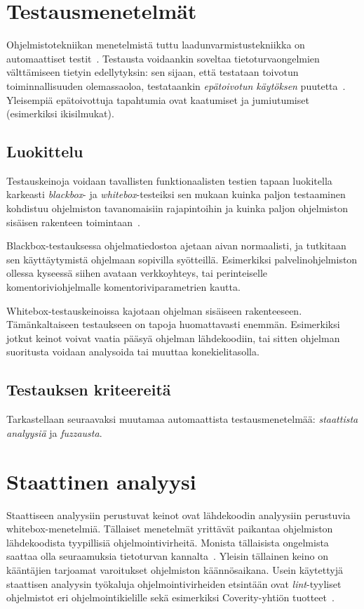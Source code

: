 \section{Testausmenetelmät}

Ohjelmistotekniikan menetelmistä tuttu laadunvarmistustekniikka on automaattiset testit~\cite{Sommerville}.
Testausta voidaankin soveltaa tietoturvaongelmien välttämiseen tietyin edellytyksin:
sen sijaan, että testataan toivotun toiminnallisuuden olemassaoloa,
testataankin \emph{epätoivotun käytöksen} puutetta~\cite{OuluBrowser}.
Yleisempiä epätoivottuja tapahtumia ovat kaatumiset ja jumiutumiset (esimerkiksi ikisilmukat).

\subsection{Luokittelu}

Testauskeinoja voidaan tavallisten funktionaalisten testien tapaan luokitella karkeasti \emph{blackbox}- ja \emph{whitebox}-testeiksi sen mukaan kuinka paljon
testaaminen kohdistuu ohjelmiston tavanomaisiin rajapintoihin ja kuinka paljon ohjelmiston sisäisen rakenteen toimintaan~\cite{Sommerville}.

Blackbox-testauksessa ohjelmatiedostoa ajetaan aivan normaalisti,
ja tutkitaan sen käyttäytymistä ohjelmaan sopivilla syötteillä.
Esimerkiksi palvelinohjelmiston ollessa kyseessä siihen avataan verkkoyhteys,
tai perinteiselle komentoriviohjelmalle komentoriviparametrien kautta.

Whitebox-testauskeinoissa kajotaan ohjelman sisäiseen rakenteeseen.
Tä\-män\-kal\-tai\-seen testaukseen on tapoja huomattavasti enemmän.
Esimerkiksi jotkut keinot voivat vaatia pääsyä ohjelman lähdekoodiin,
tai sitten ohjelman suoritusta voidaan analysoida tai muuttaa konekielitasolla.

\subsection{Testauksen kriteereitä}

Tarkastellaan seuraavaksi muutamaa automaattista testausmenetelmää: \emph{staattista analyysiä} ja \emph{fuzzausta}.

\section{Staattinen analyysi}

Staattiseen analyysiin perustuvat keinot ovat lähdekoodin analyysiin perustuvia whitebox-menetelmiä.
Tällaiset menetelmät yrittävät paikantaa ohjelmiston lähdekoodista tyypillisiä ohjelmointivirheitä.
Monista tällaisista ongelmista saattaa olla seuraamuksia tietoturvan kannalta~\cite{StaticCodeAnalysis}.
Yleisin tällainen keino on kääntäjien tarjoamat varoitukset ohjelmiston käännösaikana.
Usein käytettyjä staattisen analyysin työkaluja ohjelmointivirheiden etsintään
ovat \emph{lint}-tyyliset~\cite{Lint} ohjelmistot eri ohjelmointikielille sekä
esimerkiksi Coverity-yhtiön tuotteet~\cite{Coverity}.

